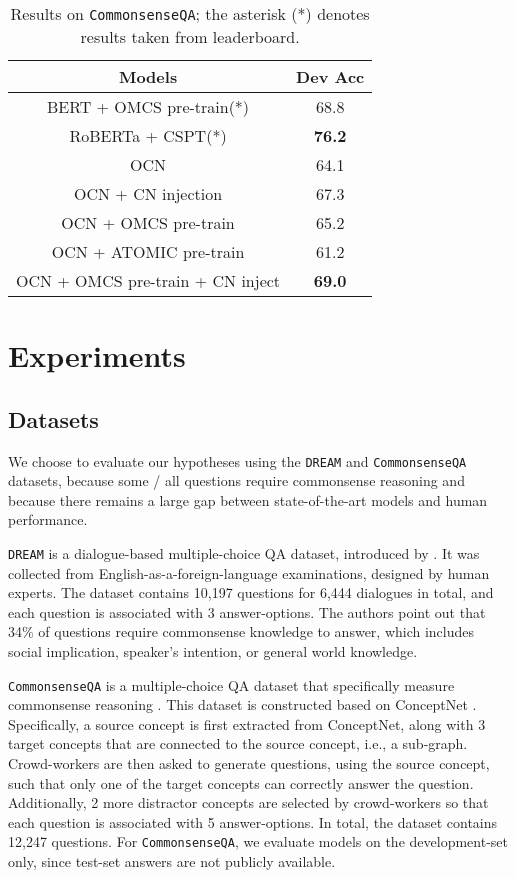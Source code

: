 \documentclass[11pt,a4paper]{article}
\begin{document}
\begin{table}[h]
\footnotesize
\begin{center}
\begin{tabular}{|c|c|}
\hline \bf Models & \bf Dev Acc  \\ \hline
BERT + OMCS pre-train(*) & 68.8 \\
RoBERTa + CSPT(*) & \bf 76.2 \\ \hline
OCN & 64.1 \\
OCN + CN injection & 67.3 \\
OCN + OMCS pre-train & 65.2 \\
OCN + ATOMIC pre-train & 61.2 \\
OCN + OMCS pre-train + CN inject & \bf 69.0 \\


\hline
\end{tabular}
\end{center}
\caption{Results on \texttt{CommonsenseQA}; the asterisk (*) denotes results taken from leaderboard.}
\label{csqa-results}
\end{table}

\section{Experiments}
\label{experiments}

\subsection{Datasets}
\label{datasets}
We choose to evaluate our hypotheses using the \texttt{DREAM} and \texttt{CommonsenseQA} datasets, because some / all questions require commonsense reasoning and because there remains a large gap between state-of-the-art models and human performance. 
  
\texttt{DREAM} is a dialogue-based multiple-choice QA dataset, introduced by \citet{TACL1534}. It was collected from English-as-a-foreign-language examinations, designed by human experts. The dataset contains 10,197 questions for 6,444 dialogues in total, and each question is associated with 3 answer-options. The authors point out that 34\% of questions require commonsense knowledge to answer, which includes social implication, speaker's intention, or general world knowledge. 

\texttt{CommonsenseQA} is a multiple-choice QA dataset that specifically measure commonsense reasoning \cite{talmor-etal-2019-commonsenseqa}. This dataset is constructed based on ConceptNet \cite{speer2016conceptnet}. Specifically, a source concept is first extracted from ConceptNet, along with 3 target concepts that are connected to the source concept, i.e., a sub-graph. Crowd-workers are then asked to generate questions, using the source concept, such that only one of the target concepts can correctly answer the question. Additionally, 2 more distractor concepts are selected by crowd-workers so that each question is associated with 5 answer-options. In total, the dataset contains 12,247 questions. For \texttt{CommonsenseQA}, we evaluate models on the development-set only, since test-set answers are not publicly available.
\end{document}
